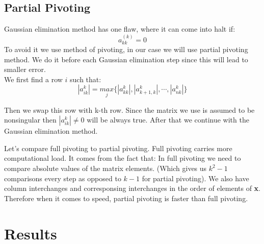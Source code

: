\documentclass[12pt]{report}
\begin{document}
\newpage
\subsection{Partial Pivoting}
Gaussian elimination method has one flaw, where it can come into halt if:
\[ a_{kk}^{(k)} = 0 \]
To avoid it we use method of pivoting, in our case we will use partial pivoting method.
We do it before each Gaussian elimination step since this will lead to smaller error.
\\We first find a row $i$ such that:
\[ |{a_{ik}^{k}}| = \underset{j}{max} \{ |{a_{kk}^{k}}|, |{a_{k+1, k}^{k}}|, \cdots, |{a_{nk}^{k}}|\} \]

Then we swap this row with k-th row. Since the matrix we use is assumed to be nonsingular then $|{a_{ik}^{k}}| \neq 0$ will be always true. After that we continue with the Gaussian elimination method.

Let's compare full pivoting to partial pivoting.
Full pivoting carries more computational load. It comes from the fact that:
In full pivoting we need to compare absolute values of the matrix elements. (Which gives us $ k^2-1$ comparisons every step as opposed to $k-1$ for partial pivoting). We also have column interchanges and corresponsing interchanges in the order of elements of \textbf{x}.
Therefore when it comes to speed, partial pivoting is faster than full pivoting.

\newpage
\section{Results}
\end{document}
